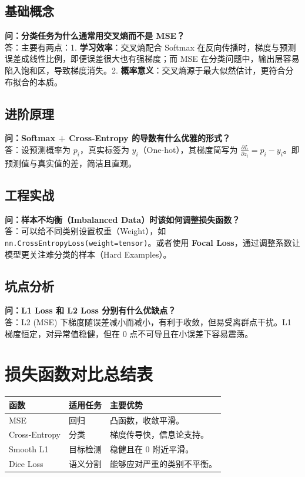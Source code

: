 \documentclass[12pt, a4paper]{book}
\begin{document}
\subsection{基础概念}
\textbf{问：分类任务为什么通常用交叉熵而不是 MSE？}\\
答：主要有两点：1. \textbf{学习效率}：交叉熵配合 Softmax 在反向传播时，梯度与预测误差成线性比例，即便误差很大也有强梯度；而 MSE 在分类问题中，输出层容易陷入饱和区，导致梯度消失。2. \textbf{概率意义}：交叉熵源于最大似然估计，更符合分布拟合的本质。

\subsection{进阶原理}
\textbf{问：Softmax + Cross-Entropy 的导数有什么优雅的形式？}\\
答：设预测概率为 $p_i$，真实标签为 $y_i$（One-hot），其梯度简写为 $\frac{\partial L}{\partial z_i} = p_i - y_i$。即预测值与真实值的差，简洁且直观。

\subsection{工程实战}
\textbf{问：样本不均衡（Imbalanced Data）时该如何调整损失函数？}\\
答：可以给不同类别设置权重（Weight），如 \texttt{nn.CrossEntropyLoss(weight=tensor)}。或者使用 \textbf{Focal Loss}，通过调整系数让模型更关注难分类的样本（Hard Examples）。

\subsection{坑点分析}
\textbf{问：L1 Loss 和 L2 Loss 分别有什么优缺点？}\\
答：L2 (MSE) 下梯度随误差减小而减小，有利于收敛，但易受离群点干扰。L1 梯度恒定，对异常值稳健，但在 0 点不可导且在小误差下容易震荡。

\section{损失函数对比总结表}

\begin{table}[h]
\centering
\begin{tabularx}{\textwidth}{|l|l|X|}
\hline
\textbf{函数} & \textbf{适用任务} & \textbf{主要优势} \\
\hline
MSE & 回归 & 凸函数，收敛平滑。 \\
\hline
Cross-Entropy & 分类 & 梯度传导快，信息论支持。 \\
\hline
Smooth L1 & 目标检测 & 稳健且在 0 附近平滑。 \\
\hline
Dice Loss & 语义分割 & 能够应对严重的类别不平衡。 \\
\hline
\end{tabularx}
\end{table}
\end{document}
